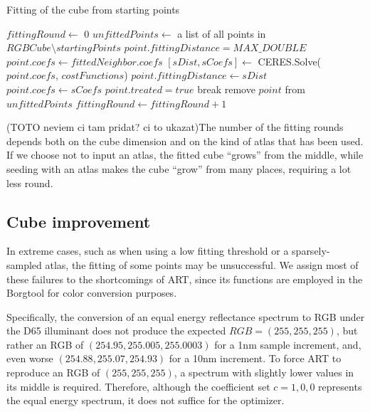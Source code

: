 \begin{algorithm}[t!]
	\caption{Fitting of the cube from starting points}
	\label{alg:upliftingAlgMoments}
	\begin{algorithmic}[1]
		\State $fittingRound \gets$ $0$
		\State $unfittedPoints \gets$ a list of all points in $RGBCube \setminus startingPoints$
		\State $point.fittingDistance = MAX\_DOUBLE$
		\EndFor
		 \label{algStep:coefficientRecomputation}
		\Else
		\State $point.coefs \gets fittedNeighbor.coefs$
		\EndIf 
		\State $[sDist,sCoefs]\gets$ CERES.Solve($point.coefs$, $costFunctions$)
		\State $point.fittingDistance \gets sDist$
		\State $point.coefs \gets sCoefs$
		\EndIf
		\State $point.treated = true$
		\State break
		\EndIf
		\EndFor
		\State remove $point$ from $unfittedPoints$
		\EndIf
		\EndFor	
		\State $fittingRound \gets fittingRound+1$
		\EndWhile
	\end{algorithmic}
\end{algorithm}

(TOTO neviem ci tam pridat? ci to ukazat)The number of the fitting rounds depends both on the cube dimension and on the kind of atlas that has been used. If we choose not to input an atlas, the fitted cube ``grows'' from the middle, while seeding with an atlas makes the cube ``grow'' from many places, requiring a lot less round.

\subsection{Cube improvement} \label{ssec:cubeImprovement}

In extreme cases, such as when using a low fitting threshold or a sparsely-sampled atlas, the fitting of some points may be unsuccessful. We assign most of these failures to the shortcomings of ART, since its functions are employed in the Borgtool for color conversion purposes.

Specifically, the conversion of an equal energy reflectance spectrum to RGB under the D65 illuminant does not produce the expected $RGB = (255, 255, 255)$, but rather an RGB of $(254.95, 255.005, 255.0003)$ for a 1nm sample increment, and, even worse $(254.88, 255.07, 254.93)$ for a 10nm increment. To force ART to reproduce an RGB of $(255, 255, 255)$, a spectrum with slightly lower values in its middle is required. Therefore, although the coefficient set $c = {1, 0, 0}$ represents the equal energy spectrum, it does not suffice for the optimizer.

